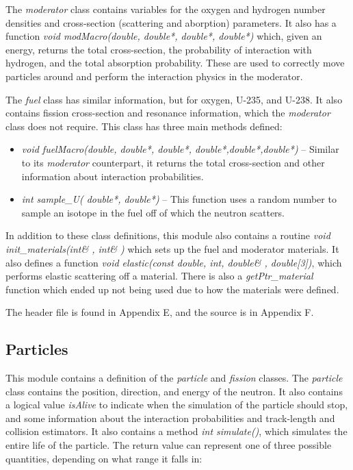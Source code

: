 The \textit{moderator} class contains variables for the oxygen and hydrogen number densities and cross-section (scattering and aborption) parameters.  It also has a function \textit{void modMacro(double, double*, double*, double*)} which, given an energy, returns the total cross-section, the probability of interaction with hydrogen, and the total absorption probability.  These are used to correctly move particles around and perform the interaction physics in the moderator.

The \textit{fuel} class has similar information, but for oxygen, U-235, and U-238.  It also contains fission cross-section and resonance information, which the \textit{moderator} class does not require.  This class has three main methods defined:

\begin{itemize}
\item \textit{void fuelMacro(double, double*, double*, double*,double*,double*)} -- Similar to its \textit{moderator} counterpart, it returns the total cross-section and other information about interaction probabilities.
\item \textit{int sample{\_}U( double*, double*)} -- This function uses a random number to sample an isotope in the fuel off of which the neutron scatters.
\end{itemize}

In addition to these class definitions, this module also contains a routine \textit{void init{\_}materials(int\& , int\& )} which sets up the fuel and moderator materials.  It also defines a function \textit{void elastic(const double, int, double\& , double[3])}, which performs elastic scattering off a material.  There is also a \textit{getPtr{\_}material} function which ended up not being used due to how the materials were defined.

The header file is found in Appendix E, and the source is in Appendix F.

\subsection{Particles}\label{ss:particles}

This module contains a definition of the \textit{particle} and \textit{fission} classes.  The \textit{particle} class contains the position, direction, and energy of the neutron.  It also contains a logical value \textit{isAlive} to indicate when the simulation of the particle should stop, and some information about the interaction probabilities and track-length and collision estimators.  It also contains a method \textit{int simulate()}, which simulates the entire life of the particle.  The return value can represent one of three possible quantities, depending on what range it falls in:


